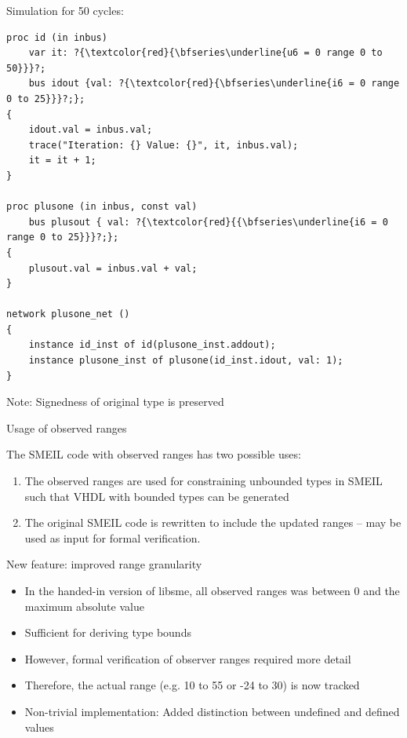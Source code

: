 \documentclass{beamer}
\begin{document}
\begin{frame}[fragile]
  Simulation for 50 cycles:

\begin{lstlisting}[language=smeil]
proc id (in inbus)
    var it: ?{\textcolor{red}{\bfseries\underline{u6 = 0 range 0 to 50}}}?;
    bus idout {val: ?{\textcolor{red}{\bfseries\underline{i6 = 0 range 0 to 25}}}?;};
{
    idout.val = inbus.val;
    trace("Iteration: {} Value: {}", it, inbus.val);
    it = it + 1;
}

proc plusone (in inbus, const val)
    bus plusout { val: ?{\textcolor{red}{{\bfseries\underline{i6 = 0 range 0 to 25}}}?;};
{
    plusout.val = inbus.val + val;
}

network plusone_net ()
{
    instance id_inst of id(plusone_inst.addout);
    instance plusone_inst of plusone(id_inst.idout, val: 1);
}

\end{lstlisting}
  Note: Signedness of original type is  preserved
\end{frame}

\begin{frame}{Usage of observed ranges}

  The SMEIL code with observed ranges has two possible uses:
  \begin{enumerate}
  \item The observed ranges are used for constraining unbounded types in SMEIL
    such that VHDL with bounded types can be generated
    \pause
  \item The original SMEIL code is rewritten to include the updated ranges --
    may be used as input for formal verification.
  \end{enumerate}
\end{frame}

\begin{frame}{New feature: improved range granularity}
  \begin{itemize}
  \item In the handed-in version of libsme, all observed ranges was between 0
    and the maximum absolute value
  \item Sufficient for deriving type bounds
  \item However, formal verification of observer ranges required more detail
  \item Therefore, the actual range (e.g. 10 to 55 or -24 to 30) is now tracked
  \item Non-trivial implementation: Added distinction between undefined and
    defined values
  \end{itemize}
  
\end{frame}
\end{document}
